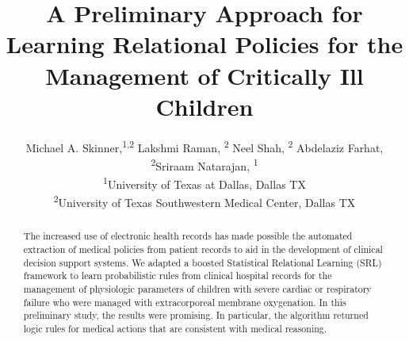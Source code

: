 \documentclass[letterpaper]{article} %
\title{A Preliminary Approach for Learning Relational Policies for the Management of Critically Ill Children}
\author{Michael A. Skinner,\textsuperscript{\rm 1,2} Lakshmi Raman, \textsuperscript{\rm 2} Neel Shah, \textsuperscript{\rm 2} Abdelaziz Farhat, \textsuperscript{\rm 2}Sriraam Natarajan, \textsuperscript{\rm 1}\\ %
\textsuperscript{\rm 1}University of Texas at Dallas, Dallas TX\\ 
\textsuperscript{\rm 2}University of Texas Southwestern Medical Center, Dallas TX%
}
\def\UrlFont{\rm}  %
\begin{document}
\maketitle

%
%
%
%
\newcommand{\sn}[1]{\textcolor{Red}{[#1 \textsc{--Sriraam}]}}
\newcommand{\ms}[1]{\textcolor{Blue}{[#1 \textsc{--Mike}]}}
%
%
%
%
%
%
%
\begin{abstract}
The increased use of electronic health records has made possible the automated extraction of medical policies from patient records to aid in the development of clinical decision support systems. We adapted a boosted Statistical Relational Learning (SRL) framework to learn probabilistic rules from clinical hospital records for the management of physiologic parameters of children with severe cardiac or respiratory failure who were managed with extracorporeal membrane oxygenation. In this preliminary study, the results were promising. In particular, the algorithm returned logic rules for medical actions that are consistent with medical reasoning.

\end{abstract}
%
%
%
\end{document}
